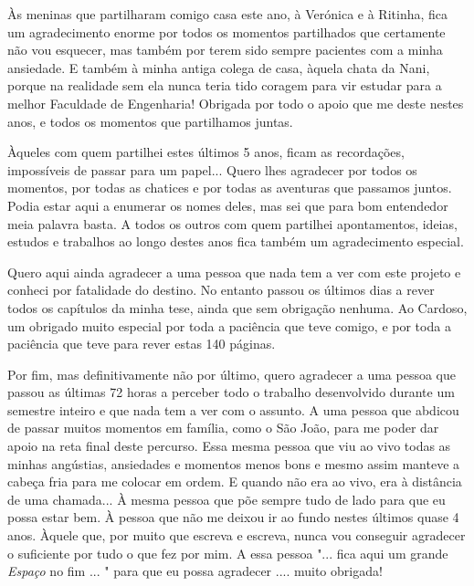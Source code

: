 Às meninas que partilharam comigo casa este ano, à Verónica e à Ritinha, fica um agradecimento enorme por todos os momentos partilhados que certamente não vou esquecer, mas também por terem sido sempre pacientes com a minha ansiedade. E também à minha antiga colega de casa, àquela chata da Nani, porque na realidade sem ela nunca teria tido coragem para vir estudar para a melhor Faculdade de Engenharia! Obrigada por todo o apoio que me deste nestes anos, e todos os momentos que partilhamos juntas.

Àqueles com quem partilhei estes últimos 5 anos, ficam as recordações, impossíveis de passar para um papel... Quero lhes agradecer por todos os momentos, por todas as chatices e por todas as aventuras que passamos juntos. Podia estar aqui a enumerar os nomes deles, mas sei que para bom entendedor meia palavra basta. A todos os outros com quem partilhei apontamentos, ideias, estudos e trabalhos ao longo destes anos fica também um agradecimento especial.

Quero aqui ainda agradecer a uma pessoa que nada tem a ver com este projeto e conheci por fatalidade do destino. No entanto passou os últimos dias a rever todos os capítulos da minha tese, ainda que sem obrigação nenhuma. Ao Cardoso, um obrigado muito especial por toda a paciência que teve comigo, e por toda a paciência que teve para rever estas 140 páginas.

Por fim, mas definitivamente não por último, quero agradecer a uma pessoa que passou as últimas 72 horas a perceber todo o trabalho desenvolvido durante um semestre inteiro e que nada tem a ver com o assunto. A uma pessoa que abdicou de passar muitos momentos em família, como o São João, para me poder dar apoio na reta final deste percurso. Essa mesma pessoa que viu ao vivo todas as minhas angústias, ansiedades e momentos menos bons e mesmo assim manteve a cabeça fria para me colocar em ordem. E quando não era ao vivo, era à distância de uma chamada... À mesma pessoa que põe sempre tudo de lado para que eu possa estar bem. À pessoa que não me deixou ir ao fundo nestes últimos quase 4 anos. Àquele que, por muito que escreva e escreva, nunca vou conseguir agradecer o suficiente por tudo o que fez por mim.  A essa pessoa "... fica aqui um grande \textit{Espaço} no fim ... " para que eu possa agradecer .... muito obrigada!

\vspace{10mm}
